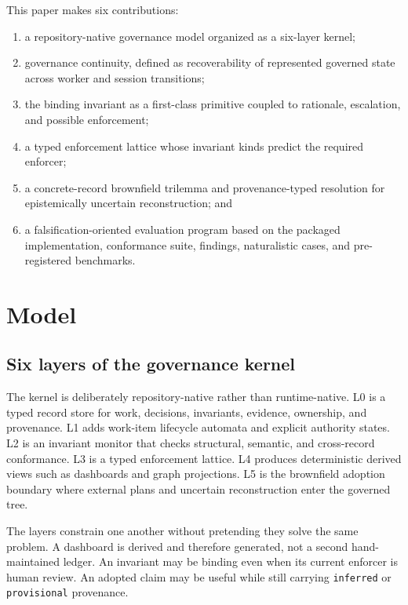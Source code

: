 \documentclass[11pt]{article}
\begin{document}
This paper makes six contributions:
\begin{enumerate}[leftmargin=*]
  \item a repository-native governance model organized as a six-layer kernel;
  \item governance continuity, defined as recoverability of represented governed state
        across worker and session transitions;
  \item the binding invariant as a first-class primitive coupled to rationale,
        escalation, and possible enforcement;
  \item a typed enforcement lattice whose invariant kinds predict the required enforcer;
  \item a concrete-record brownfield trilemma and provenance-typed resolution for
        epistemically uncertain reconstruction; and
  \item a falsification-oriented evaluation program based on the packaged implementation,
        conformance suite, findings, naturalistic cases, and pre-registered benchmarks.
\end{enumerate}

\section{Model}

\subsection{Six layers of the governance kernel}

The kernel is deliberately repository-native rather than runtime-native. L0 is a typed
record store for work, decisions, invariants, evidence, ownership, and provenance. L1
adds work-item lifecycle automata and explicit authority states. L2 is an invariant monitor
that checks structural, semantic, and cross-record conformance. L3 is a typed enforcement
lattice. L4 produces deterministic derived views such as dashboards and graph projections.
L5 is the brownfield adoption boundary where external plans and uncertain reconstruction
enter the governed tree.

The layers constrain one another without pretending they solve the same problem. A
dashboard is derived and therefore generated, not a second hand-maintained ledger. An
invariant may be binding even when its current enforcer is human review. An adopted claim
may be useful while still carrying \texttt{inferred} or \texttt{provisional} provenance.
\end{document}

